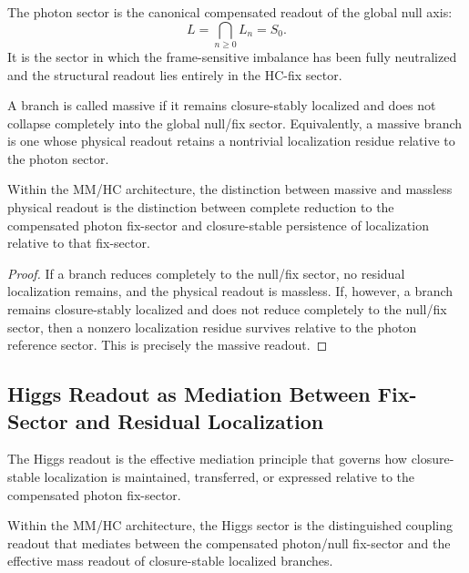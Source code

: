 \begin{definition}
The photon sector is the canonical compensated readout of the global null
axis:
\[
L=\bigcap_{n\ge 0} L_n = S_0.
\]
It is the sector in which the frame-sensitive imbalance has been fully
neutralized and the structural readout lies entirely in the HC-fix sector.
\end{definition}

\begin{definition}
A branch is called massive if it remains closure-stably localized and does not
collapse completely into the global null/fix sector. Equivalently, a massive
branch is one whose physical readout retains a nontrivial localization residue
relative to the photon sector.
\end{definition}

\begin{theorem}
\label{thm:massive-vs-massless}
Within the MM/HC architecture, the distinction between massive and massless
physical readout is the distinction between complete reduction to the
compensated photon fix-sector and closure-stable persistence of localization
relative to that fix-sector.
\end{theorem}

\begin{proof}
If a branch reduces completely to the null/fix sector, no residual
localization remains, and the physical readout is massless. If, however, a
branch remains closure-stably localized and does not reduce completely to the
null/fix sector, then a nonzero localization residue survives relative to the
photon reference sector. This is precisely the massive readout.
\end{proof}

\subsection{Higgs Readout as Mediation Between Fix-Sector and Residual Localization}
\label{subsec:higgs-fix-localization}

\begin{definition}
\label{def:higgs-mediation}
The Higgs readout is the effective mediation principle that governs how
closure-stable localization is maintained, transferred, or expressed relative
to the compensated photon fix-sector.
\end{definition}

\begin{theorem}
\label{thm:higgs-role-refined}
Within the MM/HC architecture, the Higgs sector is the distinguished coupling
readout that mediates between the compensated photon/null fix-sector and the
effective mass readout of closure-stable localized branches.
\end{theorem}

